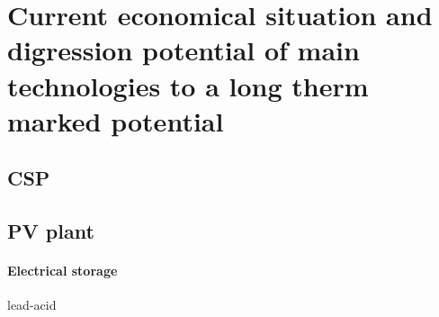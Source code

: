 \chapter{Current economical situation and digression potential of main technologies to a long therm marked potential}
\section{CSP}
\cite{Smith2012}

\section{PV plant}

\subsubsection{Electrical storage}
lead-acid





\pagebreak
